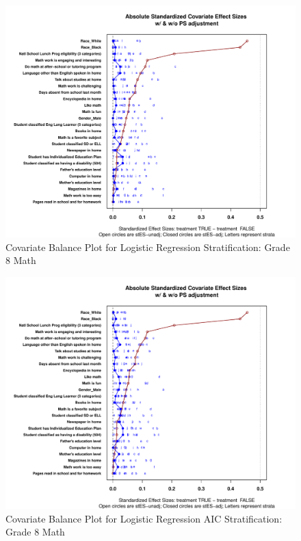 \documentclass[letterpaper,12p,twoside]{article} %
\begin{document}
\begin{figure}[h!]
\begin{center}
\includegraphics[width=\textwidth]{../Figures2009/g8math-lr-balance.pdf}
\caption{Covariate Balance Plot for Logistic Regression Stratification: Grade 8 Math}
\end{center}
\end{figure}

\begin{figure}
\begin{center}
\includegraphics[width=\textwidth]{../Figures2009/g8math-lrAIC-balance.pdf}
\caption{Covariate Balance Plot for Logistic Regression AIC Stratification: Grade 8 Math}
\end{center}
\end{figure}
\end{document}
